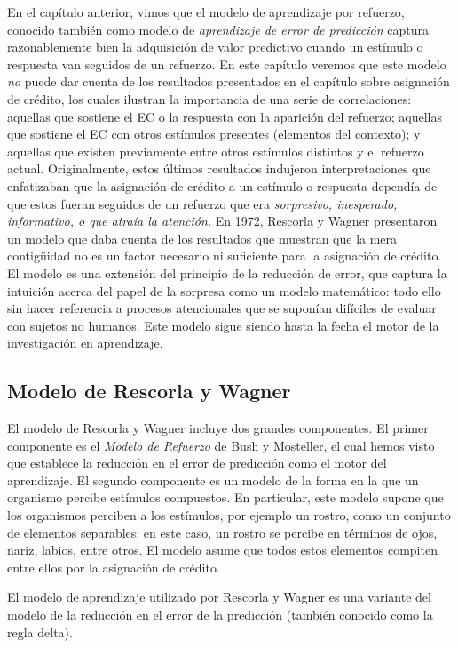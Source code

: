 \documentclass[
  a4paper,
  DIV=11,
  numbers=noendperiod]{scrreprt}
\begin{document}
En el capítulo anterior, vimos que el modelo de aprendizaje por
refuerzo, conocido también como modelo de \emph{aprendizaje de error de
predicción} captura razonablemente bien la adquisición de valor
predictivo cuando un estímulo o respuesta van seguidos de un refuerzo.
En este capítulo veremos que este modelo \emph{no} puede dar cuenta de
los resultados presentados en el capítulo sobre asignación de crédito,
los cuales ilustran la importancia de una serie de correlaciones:
aquellas que sostiene el EC o la respuesta con la aparición del
refuerzo; aquellas que sostiene el EC con otros estímulos presentes
(elementos del contexto); y aquellas que existen previamente entre otros
estímulos distintos y el refuerzo actual. Originalmente, estos últimos
resultados indujeron interpretaciones que enfatizaban que la asignación
de crédito a un estímulo o respuesta dependía de que estos fueran
seguidos de un refuerzo que era \emph{sorpresivo, inesperado,
informativo, o que atraía la atención. } En 1972, Rescorla y Wagner
presentaron un modelo que daba cuenta de los resultados que muestran que
la mera contigüidad no es un factor necesario ni suficiente para la
asignación de crédito. El modelo es una extensión del principio de la
reducción de error, que captura la intuición acerca del papel de la
sorpresa como un modelo matemático: todo ello sin hacer referencia a
procesos atencionales que se suponían difíciles de evaluar con sujetos
no humanos. Este modelo sigue siendo hasta la fecha el motor de la
investigación en aprendizaje.

\subsection{Modelo de Rescorla y
Wagner}\label{modelo-de-rescorla-y-wagner}

El modelo de Rescorla y Wagner incluye dos grandes componentes. El
primer componente es el \emph{Modelo de Refuerzo} de Bush y Mosteller,
el cual hemos visto que establece la reducción en el error de predicción
como el motor del aprendizaje. El segundo componente es un modelo de la
forma en la que un organismo percibe estímulos compuestos. En
particular, este modelo supone que los organismos perciben a los
estímulos, por ejemplo un rostro, como un conjunto de elementos
separables: en este caso, un rostro se percibe en términos de ojos,
nariz, labios, entre otros. El modelo asume que todos estos elementos
compiten entre ellos por la asignación de crédito.

El modelo de aprendizaje utilizado por Rescorla y Wagner es una variante
del modelo de la reducción en el error de la predicción (también
conocido como la regla delta).
\end{document}
